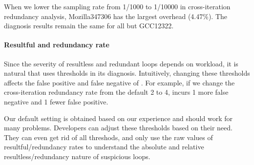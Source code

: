 When we lower the sampling rate from 1/1000 to 1/10000
in cross-iteration redundancy analysis,
Mozilla347306 has the largest overhead (4.47\%). 
The diagnosis results remain 
the same for all but GCC12322.

\paragraph{Resultful and redundancy rate}
Since the severity of resultless and redundant loops depends on
workload, it is natural that \Tool uses thresholds in its diagnosis.
Intuitively, changing these thresholds affects the
false positive and false negative of \Tool. For example, 
if we change the cross-iteration redundancy rate from the default 2
to 4, \Tool incurs 1 more false negative and 1 fewer false positive.

Our default setting is obtained based on our experience
and should work for many problems.
Developers can adjust these thresholds based on their
need. They can even get rid of all threshods, and only
use the raw values of resultful/redundancy rates to understand
the absolute and relative resultless/redundancy nature of suspicious 
loops. 


